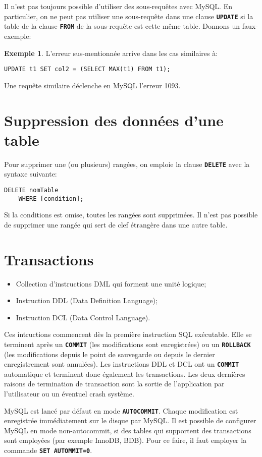 \documentclass[a4paper, 12pt]{report}
\newcommand{\textSQL}[1]{\texttt{\textbf{#1}}}
\theoremstyle{definition} \newtheorem{ex}{Exemple}
\begin{document}
Il n'est pas toujours possible d'utiliser des sous-requêtes avec MySQL. En particulier, on ne peut pas utiliser une sous-requête dans une clause \textSQL{UPDATE} si la table de la clause \textSQL{FROM} de la sous-requête est cette même table. Donnons un faux-exemple:
\begin{ex}
L'erreur sus-mentionnée arrive dans les cas similaires à:
\begin{lstlisting}[frame=single]
UPDATE t1 SET col2 = (SELECT MAX(t1) FROM t1);
\end{lstlisting}
Une requête similaire déclenche en MySQL l'erreur 1093.
\end{ex}

\section{Suppression des données d'une table}
Pour supprimer une (ou plusieurs) rangées, on emploie la clause \textSQL{DELETE} avec la syntaxe suivante:
\begin{lstlisting}[frame=single]
DELETE nomTable
	WHERE [condition];
\end{lstlisting}
Si la conditions est omise, toutes les rangées sont supprimées. Il n'est pas possible de supprimer une rangée qui sert de clef étrangère dans une autre table.

\section{Transactions}
\begin{itemize}
\item Collection d'instructions DML qui forment une unité logique;
\item Instruction DDL (Data Definition Language);
\item Instruction DCL (Data Control Language).
\end{itemize}
Ces intructions commencent dès la première instruction SQL exécutable. Elle se terminent après un \textSQL{COMMIT} (les modifications sont enregistrées) ou un \textSQL{ROLLBACK} (les modifications depuis le point de sauvegarde ou depuis le dernier enregistrement sont annulées). Les instructions DDL et DCL ont un \textSQL{COMMIT} automatique et terminent donc également les transactions. Les deux dernières raisons de termination de transaction sont la sortie de l'application par l'utilisateur ou un éventuel crash système.

MySQL est lancé par défaut en mode \textSQL{AUTOCOMMIT}. Chaque modification est enregistrée immédiatement sur le disque par MySQL. Il est possible de configurer MySQL en mode non-autocommit, si des tables qui supportent des transactions sont employées (par exemple InnoDB, BDB). Pour ce faire, il faut employer la commande \textSQL{SET AUTOMMIT=0}.
\end{document}
